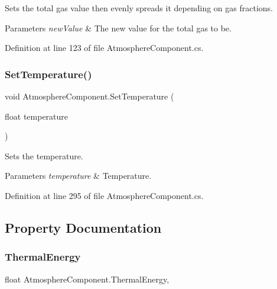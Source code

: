 Sets the total gas value then evenly spreads it depending on gas fractions. 


\begin{DoxyParams}{Parameters}
{\em new\+Value} & The new value for the total gas to be. \\
\hline
\end{DoxyParams}


Definition at line 123 of file Atmosphere\+Component.\+cs.

\mbox{\label{class_atmosphere_component_a5bfd247451db89bb03bbd4f8d2adc258}} 
\subsubsection{\texorpdfstring{Set\+Temperature()}{SetTemperature()}}
{\footnotesize\ttfamily void Atmosphere\+Component.\+Set\+Temperature (\begin{DoxyParamCaption}\item[{float}]{temperature }\end{DoxyParamCaption})}



Sets the temperature. 


\begin{DoxyParams}{Parameters}
{\em temperature} & Temperature.\\
\hline
\end{DoxyParams}


Definition at line 295 of file Atmosphere\+Component.\+cs.



\subsection{Property Documentation}
\mbox{\label{class_atmosphere_component_aefa5aa1258c50b53eb78be9bf0750cbd}} 
\subsubsection{\texorpdfstring{Thermal\+Energy}{ThermalEnergy}}
{\footnotesize\ttfamily float Atmosphere\+Component.\+Thermal\+Energy\hspace{0.3cm}{\ttfamily [get]}, {\ttfamily [set]}}



